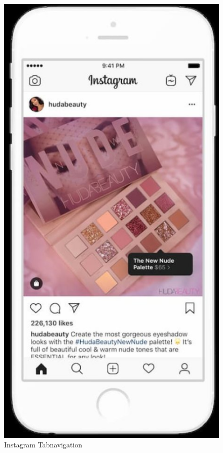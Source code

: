 \begin{figure}[H]
  \begin{minipage}[b]{0.4\textwidth}
    \includegraphics[width=\textwidth]{images/insta.PNG}
    \caption{Instagram Tabnavigation}
    \label{fig:insta}

\end{minipage}
\end{figure}
